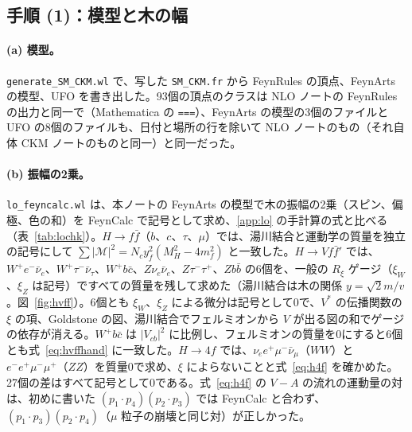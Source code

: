 \documentclass[a4paper,10pt]{ltjsarticle}
\begin{document}
\subsection{手順 (1)：模型と木の幅}\label{sec:step1}

\paragraph{(a) 模型。}\texttt{generate\_SM\_CKM.wl} で、写した \texttt{SM\_CKM.fr} から FeynRules の頂点、FeynArts の模型、UFO を書き出した。93個の頂点のクラスは NLO ノートの FeynRules の出力と同一で（Mathematica の \texttt{===}）、FeynArts の模型の3個のファイルと UFO の8個のファイルも、日付と場所の行を除いて NLO ノートのもの（それ自体 CKM ノートのものと同一）と同一だった。

\paragraph{(b) 振幅の2乗。}\texttt{lo\_feyncalc.wl} は、本ノートの FeynArts の模型で木の振幅の2乗（スピン、偏極、色の和）を FeynCalc で記号として求め、\ref{app:lo} の手計算の式と比べる（表~\ref{tab:lochk}）。$H\to f\bar f$（$b$、$c$、$\tau$、$\mu$）では、湯川結合と運動学の質量を独立の記号にして $\sum|\mathcal M|^2=N_cy_f^2(M_H^2-4m_f^2)$ と一致した。$H\to Vf\bar f'$ では、$W^+e^-\bar\nu_e$、$W^+\tau^-\bar\nu_\tau$、$W^+b\bar c$、$Z\nu_e\bar\nu_e$、$Z\tau^-\tau^+$、$Zb\bar b$ の6個を、一般の $R_\xi$ ゲージ（$\xi_W$、$\xi_Z$ は記号）ですべての質量を残して求めた（湯川結合は木の関係 $y=\sqrt2m/v$。図~\ref{fig:hvff}）。6個とも $\xi_W$、$\xi_Z$ による微分は記号として0で、$V^*$ の伝播関数の $\xi$ の項、Goldstone の図、湯川結合でフェルミオンから $V$ が出る図の和でゲージの依存が消える。$W^+b\bar c$ は $|V_{cb}|^2$ に比例し、フェルミオンの質量を0にすると6個とも式~\eqref{eq:hvffhand} に一致した。$H\to4f$ では、$\nu_ee^+\mu^-\bar\nu_\mu$（$WW$）と $e^-e^+\mu^-\mu^+$（$ZZ$）を質量0で求め、$\xi$ によらないことと式~\eqref{eq:h4f} を確かめた。27個の差はすべて記号として0である。式~\eqref{eq:h4f} の $V-A$ の流れの運動量の対は、初めに書いた $(p_1\cdot p_4)(p_2\cdot p_3)$ では FeynCalc と合わず、$(p_1\cdot p_3)(p_2\cdot p_4)$（$\mu$ 粒子の崩壊と同じ対）が正しかった。
\end{document}
